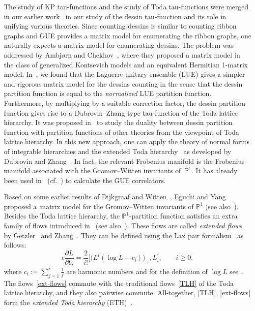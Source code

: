 \documentclass[pdftex]{sigma}
\newcommand{\e}{\epsilon}
\newcommand{\bP}{\mathbb{P}}
\newcommand{\p}{\partial}
\newcommand{\beq}{\begin{equation}}
\newcommand{\eeq}{\end{equation}}
\numberwithin{equation}{section}
\begin{document}
The study of KP tau-functions and the study of Toda tau-functions were merged
in our earlier work~\cite{YZ} in our study of the dessin tau-function and its role in unifying various theories.
Since counting dessins is similar to counting ribbon graphs and
GUE provides a matrix model for enumerating the ribbon graphs,
one naturally expects a matrix model for enumerating dessins.
The problem was addressed by Ambj{\o}rn and Chekhov~\cite{AC}, where
they proposed a matrix model in the class of generalized Kontsevich models
and an equivalent Hermitian 1-matrix model.
In~\cite{YZ}, we found that the Laguerre unitary ensemble (LUE)
gives a simpler and rigorous matrix model for the dessins
counting in the sense that the dessin partition function is equal to the {\em normalized}
LUE partition function.
Furthermore, by multiplying by a suitable correction factor,
the dessin partition function gives rise to a Dubrovin--Zhang type tau-function of the Toda lattice hierarchy.
It was proposed in~\cite{YZ} to study the
duality between dessin partition function with partition functions of other theories from the
viewpoint of Toda lattice hierarchy.
In this new approach, one can apply the theory of normal forms of integrable hierarchies
and the extended Toda hierarchy~\cite{CDZ} as developed by Dubrovin and Zhang~\cite{DZ-norm, DZ-toda}.
In fact,
the relevant Frobenius manifold is the Frobenius manifold associated with the Gromov--Witten invariants
of~$\bP^1$.
It has already been used in~\cite{Du09} (cf.\ \cite{DY, Y2}) to calculate the GUE correlators.

Based on some earlier results of Dijkgraaf and Witten~\cite{DW},
Eguchi and Yang~\cite{EY} proposed a~matrix model for the Gromov--Witten invariants of $\bP^1$ (see also~\cite{EHY}).
Besides the Toda lattice hierarchy,
the $\bP^1$-partition function satisfies an extra family of flows introduced in~\cite{EY, Getzler, Zhang} (see also~\cite{Carlet, CDZ, Du93, EY, Milanov}).
These flows are called {\it extended flows} by Getzler~\cite{Getzler} and Zhang~\cite{Zhang}.
They can be defined using the Lax pair formalism~\cite{CDZ} as follows:
\beq\label{ext-flows}
\e\frac{\p L}{\p b_i} = \frac{2}{i!}\bigl[\bigl(L^i(\log L - c_i)\bigr)_+,L\bigr], \qquad i\geq0,
\eeq
where $c_i:=\sum_{j=1}^i \frac1j$ are harmonic numbers and for the definition of $\log L$ see~\cite{CDZ, Milanov}.
The flows~\eqref{ext-flows} commute with the traditional flows~\eqref{TLH}
of the Toda lattice hierarchy, and they also pairwise commute.
All-together, \eqref{TLH}, \eqref{ext-flows} form the {\it extended Toda hierarchy} (ETH)~\cite{CDZ, Getzler, Zhang}.
\end{document}
